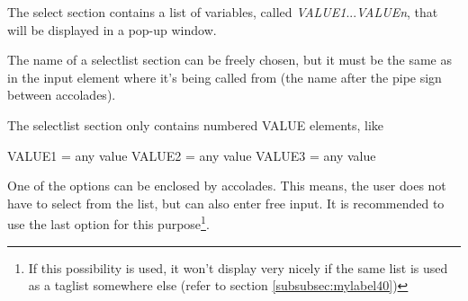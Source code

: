 \documentclass[a4paper]{book}
\newcommand{\vs}{\vspace{3mm}}
\renewcommand{\indent}{\hspace*{5mm}}
\begin{document}
\vs

The select section contains a list of variables, called \textsl{VALUE1}...\textsl{VALUE\textit{n}}, 
that will be displayed in a pop-up window.

\vs

The name of a selectlist section can be freely chosen, but it must be the 
same as in the input element where it's being called from (the name after 
the pipe sign between accolades).

The selectlist section only contains numbered VALUE elements, like \\
\begin{textsf}
\indent VALUE1 = any value \newline
\indent VALUE2 = any value \newline
\indent VALUE3 = any value \newline
\end{textsf}

\noindent One of the options can be enclosed by accolades. This means, the user does 
not have to select from the list, but can also enter free input. It is 
recommended to use the last option for this purpose\footnote{ If this possibility is used, it won't display very nicely if 
the same list is used as a taglist somewhere else (refer to section 
\ref{subsubsec:mylabel40})}.
\end{document}
